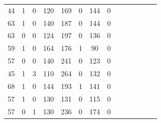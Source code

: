 \documentclass{article}
\begin{document}
\begin{longtable}{|c|c|c|c|c|c|c|c|c|c|c|c|c|c|}
44 & 1 & 0 & 120 & 169 & 0 & 144 & 0\\
63 & 1 & 0 & 140 & 187 & 0 & 144 & 0\\
63 & 0 & 0 & 124 & 197 & 0 & 136 & 0\\
59 & 1 & 0 & 164 & 176 & 1 & 90 & 0\\
57 & 0 & 0 & 140 & 241 & 0 & 123 & 0\\
45 & 1 & 3 & 110 & 264 & 0 & 132 & 0\\
68 & 1 & 0 & 144 & 193 & 1 & 141 & 0\\
57 & 1 & 0 & 130 & 131 & 0 & 115 & 0\\
57 & 0 & 1 & 130 & 236 & 0 & 174 & 0\\
\end{longtable}
\end{document}
